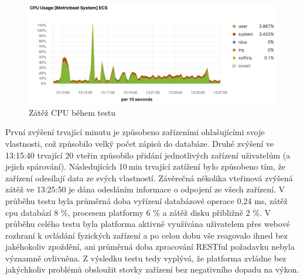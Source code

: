 \begin{figure}[htbp]
    \centering
    \includegraphics[width=\textwidth]{img/cpu_usage.png}
    \caption{\label{cpu-usage}Zátěž CPU během testu}
\end{figure}

První zvýšení trvající minutu je způsobeno zařízeními ohlašujícími svoje vlastnosti, což způsobilo velký počet zápisů do databáze. Druhé zvýšení ve 13:15:40 trvající 20 vteřin způsobilo přidání jednotlivých zařízení uživatelům (a jejich spárování). Následujících 10\,min trvající zatížení bylo způsobeno tím, že zařízení odesílají data ze svých vlastností. Závěrečná několika vteřinová zvýšená zátěž ve 13:25:50 je dána odesláním informace o odpojení ze všech zařízení. V průběhu testu byla průměrná doba vyřízení databázové operace 0,24 ms, zátěž cpu databází 8 \%, procesem platformy 6 \% a zátěž disku přibližně 2 \%. V průběhu celého testu byla platforma aktivně využívána uživatelem přes webové rozhraní k ovládání fyzických zařízení a po celou dobu vše reagovalo ihned bez jakéhokoliv zpoždění, ani průměrná doba zpracování RESTful požadavku nebyla významně ovlivněna. Z výsledku testu tedy vyplývá, že platforma zvládne bez jakýchkoliv problémů obsloužit stovky zařízení bez negativního dopadu na výkon.




